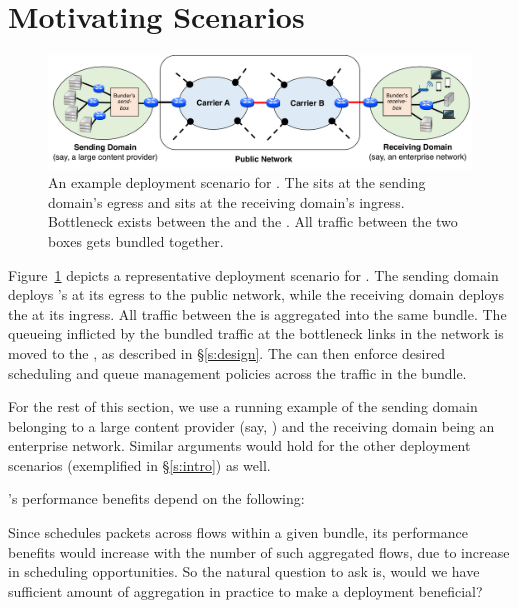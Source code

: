 \section{Motivating Scenarios}
\label{s:deploy}

\begin{figure}
    \centering
    \includegraphics[width=\textwidth]{img/deployment-arch.pdf}
    \caption{An example deployment scenario for \name. 
    The \inbox sits at the sending domain's egress and \outbox sits at the receiving domain's ingress. Bottleneck exists between the \inbox and the \outbox. All traffic between the two boxes gets bundled together. 
    }\label{fig:deploy:arch}
\end{figure}


Figure~\ref{fig:deploy:arch} depicts a representative deployment scenario for \name. The sending domain deploys \name's \inbox at its egress to the public network, while the receiving domain deploys the \outbox at its ingress. All traffic between the \pair is aggregated into the same bundle. The queueing inflicted by the bundled traffic at the bottleneck links in the network is moved to the \inbox, as described in \S\ref{s:design}. The \inbox can then enforce desired scheduling and queue management policies across the traffic in the bundle. 

For the rest of this section, we use a running example of the sending domain belonging to a large content provider (say, \egsender) and the receiving domain being an enterprise network. Similar arguments would hold for the other deployment scenarios (exemplified in \S\ref{s:intro}) as well. 

\vspace{0.05in}

\noindent \name's performance benefits depend on the following: 

Since \name schedules packets across flows within a given bundle, its performance benefits would increase with the number of such aggregated flows, due to increase in scheduling opportunities. So the natural question to ask is, would we have sufficient amount of aggregation in practice to make a \name deployment beneficial? 

